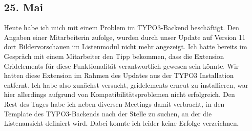 \subsection{25. Mai}
Heute habe ich mich mit einem Problem im TYPO3-Backend beschäftigt. Den Angaben einer Mitarbeiterin zufolge, wurden durch unser Update auf Version 11 dort Bildervorschauen im Listenmodul nicht mehr angezeigt. Ich hatte bereits im Gespräch mit einem Mitarbeiter den Tipp bekommen, dass die Extension Gridelements für diese Funktionalität verantwortlich gewesen sein könnte. Wir hatten diese Extension im Rahmen des Updates aus der TYPO3 Installation entfernt. Ich habe also zunächst versucht, gridelements erneut zu installieren, war hier allerdings aufgrund von Kompatibilitätsproblemen nicht erfolgreich. Den Rest des Tages habe ich neben diversen Meetings damit verbracht, in den Template des TYPO3-Backends nach der Stelle zu suchen, an der die Listenansicht definiert wird. Dabei konnte ich leider keine Erfolge verzeichnen.